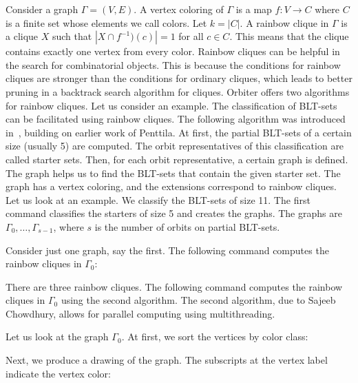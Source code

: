 Consider a  graph $\Gamma = (V,E).$ 
A vertex coloring of $\Gamma$ is a map $f: V \rightarrow C$ 
where $C$ is a finite set whose elements we call colors. 
Let $k = |C|$. 
A rainbow clique in $\Gamma$ 
is a clique $X$ such that $|X \cap f^{-1})(c)| = 1$ for all $c\in C.$ 
This means that the clique 
contains exactly one vertex from every color. 
Rainbow cliques can be helpful in the search for combinatorial objects. 
This is because the conditions for rainbow cliques 
are stronger than the conditions for ordinary cliques, 
which leads to better pruning in a backtrack search algorithm for cliques. 
Orbiter offers two algorithms for rainbow cliques. 
Let us consider an example. 
The classification of BLT-sets can be facilitated using rainbow cliques. 
The following algorithm was introduced in~\cite{Betten13}, 
building on earlier work of Penttila.
At first, the partial BLT-sets of a certain size (usually 5) are computed. 
The orbit representatives of this classification are called starter sets.
Then, for each orbit representative, a certain graph is defined. 
The graph helps us to find the BLT-sets that contain the given starter set.
The graph has a vertex coloring, and the extensions correspond to rainbow cliques. 
Let us look at an example. 
We classify the BLT-sets of size 11. 
The first command classifies the starters of size 5 and creates the graphs.
The graphs are $\Gamma_0, \ldots, \Gamma_{s-1}$, 
where $s$ is the number of orbits on partial BLT-sets.


Consider just one graph, say the first. 
The following command computes the rainbow cliques in $\Gamma_0$:


There are three rainbow cliques.
The following command computes the rainbow cliques in $\Gamma_0$ using the second algorithm.
The second algorithm, due to Sajeeb Chowdhury, allows for parallel computing using multithreading.


Let us look at the graph $\Gamma_0$. At first, we sort the vertices by color class:


Next, we produce a drawing of the graph. 
The subscripts at the vertex label indicate the vertex color:




